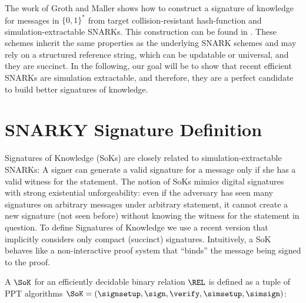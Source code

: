 
   The work of Groth and Maller
\cite{C:GroMal17} shows how to construct a signature of knowledge for messages in
$\{0, 1\}^*$ from target collision-resistant hash-function and simulation-extractable
SNARKs. This construction can be found in .
These schemes inherit the same properties as the underlying SNARK schemes and
may rely on a structured reference string, which can be updatable or universal, and they are
succinct.  In the following, our goal will be to show that recent efficient SNARKs are
simulation extractable, and therefore, they are a perfect candidate to build better
signatures of knowledge.

\section{SNARKY Signature Definition}



Signatures of Knowledge (SoKs) \cite{C:ChaLys06} are closely related to
simulation-extractable SNARKs: A signer can generate a valid signature for a message
only if she has a valid witness for the statement.
%
The notion of SoKs mimics digital signatures with strong existential unforgeability:
even if the adversary has seen many signatures on arbitrary messages under arbitrary
statement, it cannot create a new signature (not seen before) without knowing the
witness for the statement in question.
%
To define Signatures of Knowledge we use a recent version \cite{C:GroMal17} that
implicitly considers only compact (succinct) signatures.  Intuitively, a SoK behaves like a non-interactive proof system
that ``binds'' the message being signed to the proof.
     
\label{sec:sok}
A $\SoK$ for an efficiently decidable binary relation $\REL$ is defined as a tuple of PPT algorithms $\SoK = (\signsetup,  \sign, \allowbreak \verify,  \simsetup, \simsign)$:

